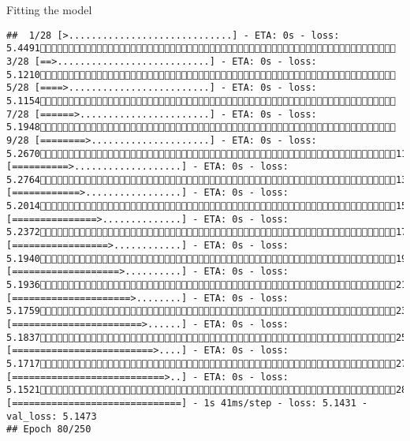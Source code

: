 \documentclass[
  ignorenonframetext,
]{beamer}
\begin{document}
\begin{frame}[fragile]{Fitting the model}
\begin{verbatim}
##  1/28 [>.............................] - ETA: 0s - loss: 5.4491 3/28 [==>...........................] - ETA: 0s - loss: 5.1210 5/28 [====>.........................] - ETA: 0s - loss: 5.1154 7/28 [======>.......................] - ETA: 0s - loss: 5.1948 9/28 [========>.....................] - ETA: 0s - loss: 5.267011/28 [==========>...................] - ETA: 0s - loss: 5.276413/28 [============>.................] - ETA: 0s - loss: 5.201415/28 [===============>..............] - ETA: 0s - loss: 5.237217/28 [=================>............] - ETA: 0s - loss: 5.194019/28 [===================>..........] - ETA: 0s - loss: 5.193621/28 [=====================>........] - ETA: 0s - loss: 5.175923/28 [=======================>......] - ETA: 0s - loss: 5.183725/28 [=========================>....] - ETA: 0s - loss: 5.171727/28 [===========================>..] - ETA: 0s - loss: 5.152128/28 [==============================] - 1s 41ms/step - loss: 5.1431 - val_loss: 5.1473
## Epoch 80/250

\end{verbatim}
\end{frame}
\end{document}
